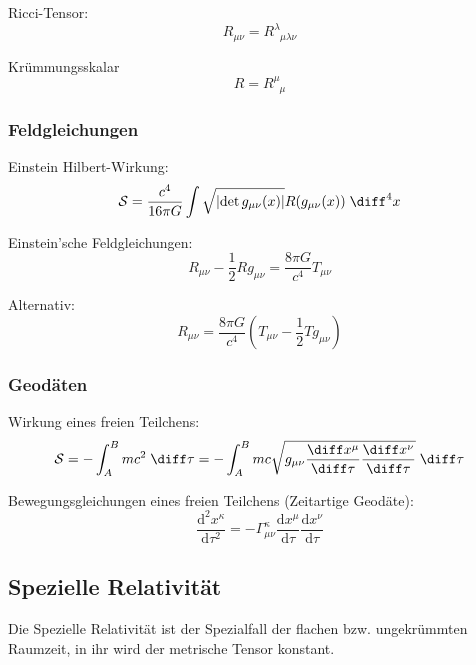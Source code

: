 \documentclass[11pt]{article}
\numberwithin{equation}{section}
\begin{document}
          Ricci-Tensor:
          \begin{equation}
            R_{\mu\nu} = R^\lambda_{\phantom{\lambda}\mu\lambda\nu}
          \end{equation}

          Krümmungsskalar
          \begin{equation}
            R = R^\mu_{\phantom{\mu}\mu}
          \end{equation}

        \subsubsection{Feldgleichungen}
          Einstein Hilbert-Wirkung:
          \begin{equation}
            \mathcal{S} = \frac{c^4}{16\pi G} \int \sqrt{\left|\det{g_{\mu\nu}(x)}\right|} R(g_{\mu\nu}(x))\;\diff^4 x
          \end{equation}

          Einstein'sche Feldgleichungen:
          \begin{equation}
            R_{\mu\nu} - \frac{1}{2} R g_{\mu\nu} = \frac{8\pi G}{c^4} T_{\mu\nu}
          \end{equation}

          Alternativ:
          \begin{equation}
            R_{\mu\nu} = \frac{8\pi G}{c^4} \left( T_{\mu\nu} - \frac{1}{2} T g_{\mu\nu} \right)
          \end{equation}


        \subsubsection{Geodäten}
          Wirkung eines freien Teilchens:
          \begin{equation}
            \mathcal{S} = -\int_A^B mc^2\;\diff \tau = -\int_A^B mc\sqrt{g_{\mu\nu} \tder{x^\mu}{\tau} \tder{x^\nu}{\tau}} \;\diff \tau
          \end{equation}

          Bewegungsgleichungen eines freien Teilchens (Zeitartige Geodäte):
          \begin{equation}
            \frac{\mathrm{d}^2 x^\kappa}{\mathrm{d}\tau^2}=-\Gamma_{\mu\nu}^{\kappa}\frac{\mathrm{d}x^\mu}{\mathrm{d}\tau}\frac{\mathrm{d}x^\nu}{\mathrm{d}\tau}
          \end{equation}

      \subsection{Spezielle Relativität}
        Die Spezielle Relativität ist der Spezialfall der flachen bzw. ungekrümmten Raumzeit, in ihr wird der metrische Tensor konstant.
\end{document}
